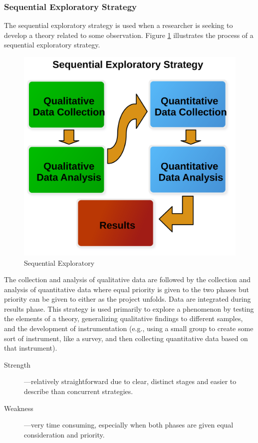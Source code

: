 \subsubsection{Sequential Exploratory Strategy}

The sequential exploratory strategy is used when a researcher is seeking to develop a theory related to some observation. Figure \ref{14:fig91} illustrates the process of a sequential exploratory strategy. 

\begin{figure}[H]
	\centering
	\includegraphics[width=\maxwidth{.95\linewidth}]{gfx/14-Seq_Explore}
	\caption{Sequential Exploratory}
	\label{14:fig91}
\end{figure}

The collection and analysis of qualitative data are followed by the collection and analysis of quantitative data where equal priority is given to the two phases but priority can be given to either as the project unfolds. Data are integrated during results phase. This strategy is used primarily to explore a phenomenon by testing the elements of a theory, generalizing qualitative findings to different samples, and the development of instrumentation (e.g., using a small group to create some sort of instrument, like a survey, and then collecting quantitative data based on that instrument).

\begin{description}
	\item[Strength]---relatively straightforward due to clear, distinct stages and easier to describe than concurrent strategies.
	\item[Weakness]---very time consuming, especially when both phases are given equal consideration and priority.
\end{description}


